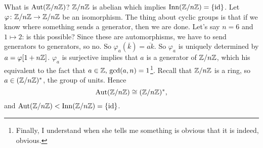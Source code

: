 \begin{example}
    What is $\operatorname{Aut}(\mathbb{Z} /n\mathbb{Z})$? $\mathbb{Z} /n\mathbb{Z}$ is abelian which implies $\operatorname{Inn}(\mathbb{Z} /n\mathbb{Z})=\{\operatorname{id}\} $. Let $\varphi \colon \mathbb{Z} /n\mathbb{Z} \to \mathbb{Z} /n\mathbb{Z}$ be an isomorphism. The thing about cyclic groups is that if we know where something sends a generator, then we are done. Let's say $n=6$ and $1\mapsto 2$: is this possible? Since these are automorphisms, we have to send generators to generators, so no. So $\varphi_a(\overline{k})=\overline{ak} $. So $\varphi _a$ is uniquely determined by $a=\varphi [1+n\mathbb{Z}]$. $\varphi _a$ is surjective implies that $a$ is a generator of $\mathbb{Z} /n\mathbb{Z}$, which his equivalent to the fact that $a\in \mathbb{Z},\, \gcd (a,n)=1$\footnote{Finally, I understand when she tells me something is obvious that it is indeed, obvious.}. Recall that $\mathbb{Z} /n\mathbb{Z}$ is a ring, so $a\in (\mathbb{Z} /n\mathbb{Z})^*$, the group of units. Hence \[
        \operatorname{Aut}(\mathbb{Z} /n\mathbb{Z})\cong(\mathbb{Z} /n\mathbb{Z})^*,
    \] and $\operatorname{Aut}(\mathbb{Z} /n\mathbb{Z}) < \operatorname{Inn}(\mathbb{Z} /n\mathbb{Z})=\{\operatorname{id}\} $.
\end{example}

